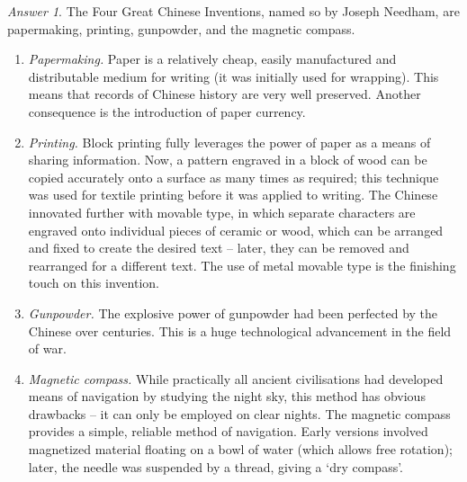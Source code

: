 \documentclass[11pt]{article}
\theoremstyle{remark}
\newtheorem*{answer}{Answer}
\begin{document}
    \begin{answer}
        The Four Great Chinese Inventions, named so by Joseph Needham, are
        papermaking, printing, gunpowder, and the magnetic compass.
        \begin{enumerate}
            \item \emph{Papermaking.} Paper is a relatively cheap, easily
            manufactured and distributable medium for writing (it was initially used
            for wrapping). This means that records of Chinese history are very well
            preserved. Another consequence is the introduction of paper currency.

            \item \emph{Printing.} Block printing fully leverages the power of paper
            as a means of sharing information. Now, a pattern engraved in a block of
            wood can be copied accurately onto a surface as many times as required;
            this technique was used for textile printing before it was applied to
            writing. The Chinese innovated further with movable type, in which
            separate characters are engraved onto individual pieces of ceramic or
            wood, which can be arranged and fixed to create the desired text --
            later, they can be removed and rearranged for a different text. The use
            of metal movable type is the finishing touch on this invention.

            \item \emph{Gunpowder.} The explosive power of gunpowder had been
            perfected by the Chinese over centuries. This is a huge technological
            advancement in the field of war.

            \item \emph{Magnetic compass.} While practically all ancient
            civilisations had developed means of navigation by studying the night
            sky, this method has obvious drawbacks -- it can only be employed on
            clear nights. The magnetic compass provides a simple, reliable method of
            navigation. Early versions involved magnetized material floating on a
            bowl of water (which allows free rotation); later, the needle was
            suspended by a thread, giving a `dry compass'.
        \end{enumerate}


\end{answer}
\end{document}
